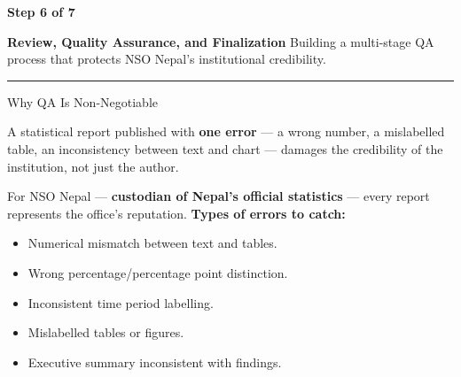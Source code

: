 \documentclass[xcolor={table,dvipsnames},aspectratio=169,11pt]{beamer}
\newcommand{\stepbadge}[1]{%
    \begin{tcolorbox}[colback=nsoGold,colframe=nsoGold,arc=8pt,auto outer arc,
        halign=center,valign=center,width=2.5cm,boxrule=0pt,top=2pt,bottom=2pt,left=2pt,right=2pt]
        \color{white}\tiny\bfseries #1
    \end{tcolorbox}%
}
\begin{document}
{
\begin{frame}[plain]
    \vspace{1.5cm}
    \stepbadge{Step 6 of 7}
    \vskip 0.4cm
    {\color{white}\LARGE\bfseries Review, Quality Assurance, and Finalization}
    \vskip 0.4cm
    {\color{nsoLight}\large Building a multi-stage QA process that protects NSO Nepal's institutional credibility.}
    \vskip 0.8cm
    \textcolor{nsoGold}{\rule{3cm}{3pt}}
\end{frame}
}

\begin{frame}{Why QA Is Non-Negotiable}
    \begin{blockquote}
    A statistical report published with \textbf{one error} --- a wrong number, a mislabelled table, an inconsistency between text and chart --- damages the credibility of the institution, not just the author.
    \end{blockquote}
    \vskip 0.2cm
    For NSO Nepal --- \textbf{custodian of Nepal's official statistics} --- every report represents the office's reputation.
    \vskip 0.2cm
    \textbf{Types of errors to catch:}
    \begin{itemize}
        \item Numerical mismatch between text and tables.
        \item Wrong percentage/percentage point distinction.
        \item Inconsistent time period labelling.
        \item Mislabelled tables or figures.
        \item Executive summary inconsistent with findings.
    \end{itemize}
\end{frame}
\end{document}
